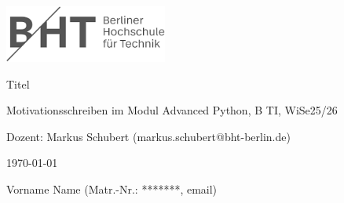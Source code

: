 \documentclass[12pt,german,english]{article}
\begin{document}
\begin{center}

    \includegraphics[width=0.4\textwidth]{bht-logo.png}

    \vspace{1.5cm}

    {\huge Titel}

    \vspace*{1cm}

    Motivationsschreiben im Modul Advanced Python, B TI, WiSe25/26

    \vspace{0.5cm}

    Dozent: Markus Schubert (markus.schubert@bht-berlin.de)

    \vspace{0.5cm}

    \todayfmtde\today

    \vspace{1cm}

    Vorname Name (Matr.-Nr.: *******, email)

\end{center}

\vspace*{1cm}

\par\blindtext
\end{document}
